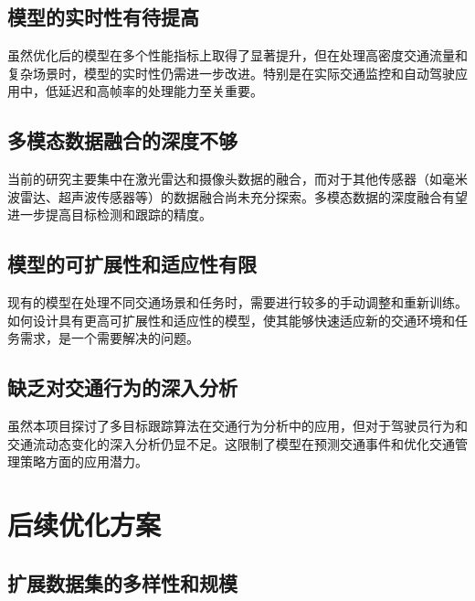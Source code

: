 \subsection{模型的实时性有待提高}


虽然优化后的模型在多个性能指标上取得了显著提升，但在处理高密度交通流量和复杂场景时，模型的实时性仍需进一步改进。特别是在实际交通监控和自动驾驶应用中，低延迟和高帧率的处理能力至关重要\cite{罗玉涛 2024 面向自动驾驶的多任务辅助驾驶策略学习方法}。





\subsection{多模态数据融合的深度不够}



当前的研究主要集中在激光雷达和摄像头数据的融合，而对于其他传感器（如毫米波雷达、超声波传感器等）的数据融合尚未充分探索。多模态数据的深度融合有望进一步提高目标检测和跟踪的精度\cite{李进 2024 智能驾驶车辆轨迹跟踪控制研究}。






\subsection{模型的可扩展性和适应性有限}


现有的模型在处理不同交通场景和任务时，需要进行较多的手动调整和重新训练。如何设计具有更高可扩展性和适应性的模型，使其能够快速适应新的交通环境和任务需求，是一个需要解决的问题\cite{胡学敏 2024 仿真到现实环境的自动驾驶决策技术综述}。



\subsection{缺乏对交通行为的深入分析}


虽然本项目探讨了多目标跟踪算法在交通行为分析中的应用，但对于驾驶员行为和交通流动态变化的深入分析仍显不足。这限制了模型在预测交通事件和优化交通管理策略方面的应用潜力\cite{zhang2019deep}。




\section{后续优化方案}



\subsection{扩展数据集的多样性和规模}


